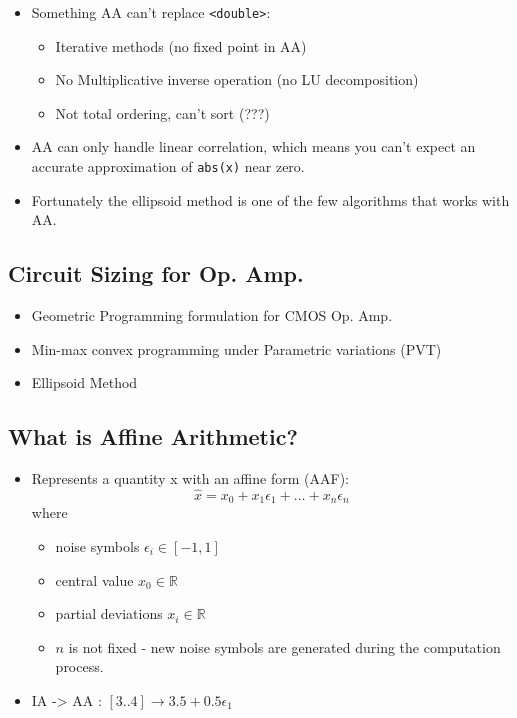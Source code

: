 \documentclass[
]{article}
\providecommand{\tightlist}{%
  \setlength{\itemsep}{0pt}\setlength{\parskip}{0pt}}
\begin{document}
\begin{itemize}
\tightlist
\item
  Something AA can't replace \texttt{\textless{}double\textgreater{}}:

  \begin{itemize}
  \tightlist
  \item
    Iterative methods (no fixed point in AA)
  \item
    No Multiplicative inverse operation (no LU decomposition)
  \item
    Not total ordering, can't sort (???)
  \end{itemize}
\item
  AA can only handle linear correlation, which means you can't expect an accurate approximation of \texttt{abs(x)} near zero.
\item
  Fortunately the ellipsoid method is one of the few algorithms that works with AA.
\end{itemize}

\hypertarget{circuit-sizing-for-op.-amp.}{%
\subsection{Circuit Sizing for Op. Amp.}\label{circuit-sizing-for-op.-amp.}}

\begin{itemize}
\tightlist
\item
  Geometric Programming formulation for CMOS Op. Amp.
\item
  Min-max convex programming under Parametric variations (PVT)
\item
  Ellipsoid Method
\end{itemize}

\hypertarget{what-is-affine-arithmetic}{%
\subsection{What is Affine Arithmetic?}\label{what-is-affine-arithmetic}}

\begin{itemize}
\tightlist
\item
  Represents a quantity x with an affine form (AAF):
  \[\hat{x} = x_0 + x_1 \epsilon_1 + \ldots + x_n \epsilon_n\] where

  \begin{itemize}
  \tightlist
  \item
    noise symbols \(\epsilon_i \in [-1, 1]\)
  \item
    central value \(x_0 \in \mathbb{R}\)
  \item
    partial deviations \(x_i \in \mathbb{R}\)
  \item
    \(n\) is not fixed - new noise symbols are generated during the computation process.
  \end{itemize}
\item
  IA -\textgreater{} AA : \([3..4] \rightarrow 3.5 + 0.5 \epsilon_1\)
\end{itemize}
\end{document}
